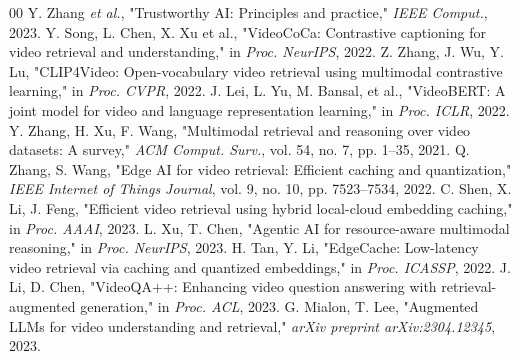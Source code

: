\documentclass[conference,twocolumn]{IEEEtran}
\begin{document}
\begin{thebibliography}{00}
 Y. Zhang \textit{et al.}, "Trustworthy AI: Principles and practice," \textit{IEEE Comput.}, 2023.
 Y. Song, L. Chen, X. Xu et al., "VideoCoCa: Contrastive captioning for video retrieval and understanding," in \textit{Proc. NeurIPS}, 2022.
 Z. Zhang, J. Wu, Y. Lu, "CLIP4Video: Open-vocabulary video retrieval using multimodal contrastive learning," in \textit{Proc. CVPR}, 2022.
 J. Lei, L. Yu, M. Bansal, et al., "VideoBERT: A joint model for video and language representation learning," in \textit{Proc. ICLR}, 2022.
 Y. Zhang, H. Xu, F. Wang, "Multimodal retrieval and reasoning over video datasets: A survey," \textit{ACM Comput. Surv.}, vol. 54, no. 7, pp. 1--35, 2021.
 Q. Zhang, S. Wang, "Edge AI for video retrieval: Efficient caching and quantization," \textit{IEEE Internet of Things Journal}, vol. 9, no. 10, pp. 7523--7534, 2022.
 C. Shen, X. Li, J. Feng, "Efficient video retrieval using hybrid local-cloud embedding caching," in \textit{Proc. AAAI}, 2023.
 L. Xu, T. Chen, "Agentic AI for resource-aware multimodal reasoning," in \textit{Proc. NeurIPS}, 2023.
 H. Tan, Y. Li, "EdgeCache: Low-latency video retrieval via caching and quantized embeddings," in \textit{Proc. ICASSP}, 2022.
 J. Li, D. Chen, "VideoQA++: Enhancing video question answering with retrieval-augmented generation," in \textit{Proc. ACL}, 2023.
 G. Mialon, T. Lee, "Augmented LLMs for video understanding and retrieval," \textit{arXiv preprint arXiv:2304.12345}, 2023.
\end{thebibliography}
\end{document}
